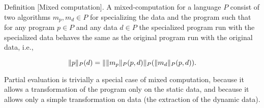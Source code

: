 Definition [Mixed computation]. A mixed-computation for a language $P$
consist of two algorithms $m_p, m_d \in P$ for specializing the data
and the program such that for any program $p \in P$ and any data $d
\in P$ the specialized program run with the specialized data behaves
the same as the original program run with the original data, i.e.,

\[
\drun{P}{p} (d) = \drun{P}{\drun{P}{m_p} (p,d)} (\drun{P}{m_d} (p,d)).
\]

Partial evaluation is trivially a special case of mixed computation,
because it allows a transformation of the program only on the static
data, and because it allows only a simple transformation on data (the
extraction of the dynamic data).
